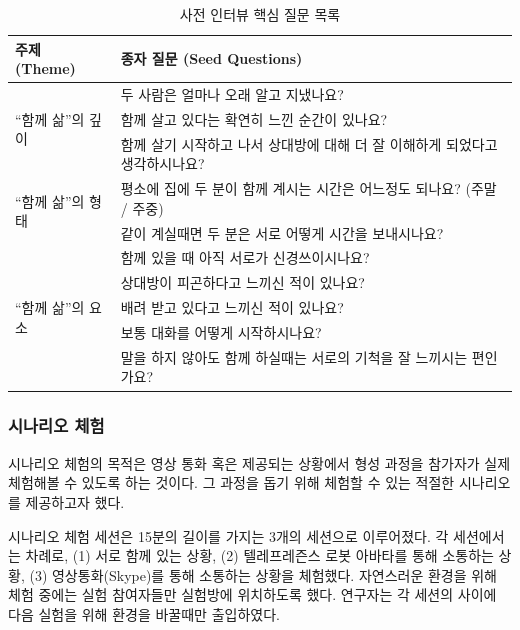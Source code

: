 \begin{table}
	\centering
	\caption{사전 인터뷰 핵심 질문 목록}
	\label{tab:userstudy_pre_questionnaire}
	\newcommand{\mr}[2]{\multirow{#1}{*}{#2}}
	\begin{tabular}{ll}
		\toprule
		\textbf{주제 (Theme)} & \textbf{종자 질문 (Seed Questions)} \\
		\midrule
		\mr{3}{``함께 삶''의 깊이}
		& 두 사람은 얼마나 오래 알고 지냈나요? \\
		& 함께 살고 있다는 확연히 느낀 순간이 있나요? \\
		& 함께 살기 시작하고 나서 상대방에 대해 더 잘 이해하게 되었다고 생각하시나요? \\
		\midrule
		\mr{2}{``함께 삶''의 형태}
		& 평소에 집에 두 분이 함께 계시는 시간은 어느정도 되나요? (주말 / 주중) \\
		& 같이 계실때면 두 분은 서로 어떻게 시간을 보내시나요? \\
		\midrule
		\mr{5}{``함께 삶''의 요소}
		& 함께 있을 때 아직 서로가 신경쓰이시나요? \\
		& 상대방이 피곤하다고 느끼신 적이 있나요? \\
		& 배려 받고 있다고 느끼신 적이 있나요? \\
		& 보통 대화를 어떻게 시작하시나요? \\
		& 말을 하지 않아도 함께 하실때는 서로의 기척을 잘 느끼시는 편인가요? \\
		\bottomrule
	\end{tabular}
\end{table}


\subsubsection{시나리오 체험}

시나리오 체험의 목적은 영상 통화 혹은 \sysname\이 제공되는 상황에서 \concept\의 형성 과정을 참가자가 실제 체험해볼 수 있도록 하는 것이다. 그 과정을 돕기 위해 \concept\를 체험할 수 있는 적절한 시나리오를 제공하고자 했다.

시나리오 체험 세션은 15분의 길이를 가지는 3개의 세션으로 이루어졌다. 각 세션에서는 차례로, (1) 서로 함께 있는 상황, (2) 텔레프레즌스 로봇 아바타를 통해 소통하는 상황, (3) 영상통화(Skype)를 통해 소통하는 상황을 체험했다. 자연스러운 환경을 위해 체험 중에는 실험 참여자들만 실험방에 위치하도록 했다. 연구자는 각 세션의 사이에 다음 실험을 위해 환경을 바꿀때만 출입하였다.

